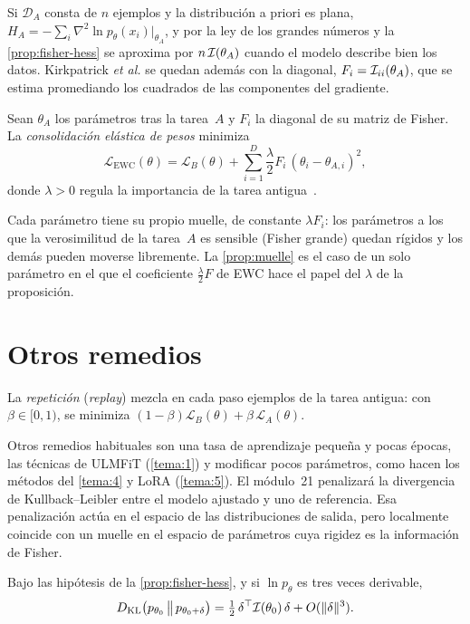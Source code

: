 Si $\mathcal{D}_A$ consta de $n$ ejemplos y la distribución a priori es plana, $H_A=-\sum_{i}\nabla^{2}\ln p_\theta(x_i)\big|_{\theta_A}$, y por la ley de los grandes números y la \cref{prop:fisher-hess} se aproxima por $n\,\mathcal{I}(\theta_A)$ cuando el modelo describe bien los datos. Kirkpatrick \emph{et al.} se quedan además con la diagonal, $F_i=\mathcal{I}_{ii}(\theta_A)$, que se estima promediando los cuadrados de las componentes del gradiente.

\begin{definicion}[EWC]\label{def:ewc}
Sean $\theta_A$ los parámetros tras la tarea~$A$ y $F_i$ la diagonal de su matriz de Fisher. La \emph{consolidación elástica de pesos} minimiza
\[
\mathcal{L}_{\mathrm{EWC}}(\theta)=\mathcal{L}_B(\theta)+\sum_{i=1}^{D}\frac{\lambda}{2}F_i\,(\theta_i-\theta_{A,i})^{2},
\]
donde $\lambda>0$ regula la importancia de la tarea antigua~\cite{kirkpatrick}.
\end{definicion}

Cada parámetro tiene su propio muelle, de constante $\lambda F_i$: los parámetros a los que la verosimilitud de la tarea~$A$ es sensible (Fisher grande) quedan rígidos y los demás pueden moverse libremente. La \cref{prop:muelle} es el caso de un solo parámetro en el que el coeficiente $\frac{\lambda}{2}F$ de EWC hace el papel del $\lambda$ de la proposición.

\section{Otros remedios}

\begin{definicion}[Repetición]\label{def:replay}
La \emph{repetición} (\emph{replay}) mezcla en cada paso ejemplos de la tarea antigua: con $\beta\in[0,1)$, se minimiza $(1-\beta)\mathcal{L}_B(\theta)+\beta\,\mathcal{L}_A(\theta)$.
\end{definicion}

Otros remedios habituales son una tasa de aprendizaje pequeña y pocas épocas, las técnicas de ULMFiT (\cref{tema:1}) y modificar pocos parámetros, como hacen los métodos del \cref{tema:4} y LoRA (\cref{tema:5}). El módulo~21 penalizará la divergencia de Kullback--Leibler entre el modelo ajustado y uno de referencia. Esa penalización actúa en el espacio de las distribuciones de salida, pero localmente coincide con un muelle en el espacio de parámetros cuya rigidez es la información de Fisher.

\begin{proposicion}\label{prop:kl-fisher}
Bajo las hipótesis de la \cref{prop:fisher-hess}, y si $\ln p_\theta$ es tres veces derivable,
\[
D_{\mathrm{KL}}\bigl(p_{\theta_0}\,\big\|\,p_{\theta_0+\delta}\bigr)=\tfrac12\,\delta^{\top}\mathcal{I}(\theta_0)\,\delta+O(\lVert\delta\rVert^{3}).
\]
\end{proposicion}

